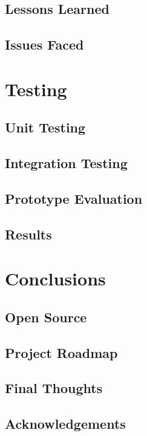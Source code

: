 \documentclass{l4proj}
\begin{document}
\section{Lessons Learned}

\section{Issues Faced}


\chapter{Testing}
\label{testing}

\section{Unit Testing}

\section{Integration Testing}

\section{Prototype Evaluation}

\section{Results}


\chapter{Conclusions}
\label{conclusions}

\section{Open Source}

\section{Project Roadmap}

\section{Final Thoughts}

\section{Acknowledgements}



\end{document}
